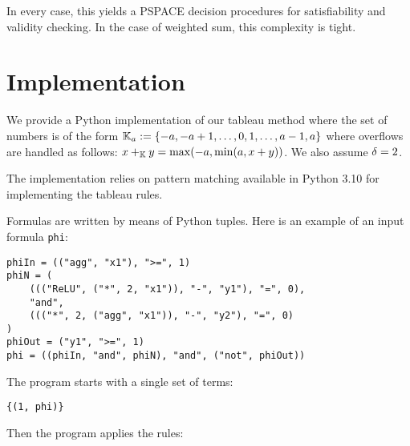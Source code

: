 \medskip
In every case, this yields a PSPACE decision procedures for satisfiability and validity checking. In the case of weighted sum, this complexity is tight.




\section{Implementation}
\label{appendix-section-implementation}

We provide a Python implementation of our tableau method where the set of numbers is of the form $\mathbb K_a := {\{-a, -a+1, \dots, 0, 1, \dots, a-1, a\}}$ where overflows are handled as follows: $x+_\mathbb K y = \max(-a, \min(a, x+y))$.
We also assume $\delta = 2$.

The implementation relies on pattern matching available in Python 3.10 for implementing the tableau rules.

Formulas are written by means of Python tuples. Here is an example of an input formula \texttt{phi}:

\begin{scriptsize}
\begin{verbatim}
phiIn = (("agg", "x1"), ">=", 1)
phiN = (
    ((("ReLU", ("*", 2, "x1")), "-", "y1"), "=", 0),
    "and",
    ((("*", 2, ("agg", "x1")), "-", "y2"), "=", 0)
)
phiOut = ("y1", ">=", 1)
phi = ((phiIn, "and", phiN), "and", ("not", phiOut))
\end{verbatim}
\end{scriptsize}


The program starts with a single set of terms:

\begin{scriptsize}
\begin{verbatim}
{(1, phi)}
\end{verbatim}
\end{scriptsize}

Then the program applies the rules:

